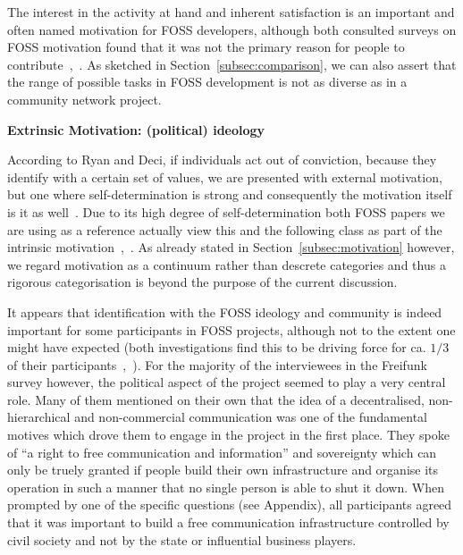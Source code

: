 The interest in the activity at hand and inherent satisfaction is an important and often named motivation for FOSS developers, although both consulted surveys on FOSS motivation found that it was not the primary reason for people to contribute~\cite{HarOu2002},~\cite{LakWo2005}.
As sketched in Section~\ref{subsec:comparison}, we can also assert that the range of possible tasks in FOSS development is not as diverse as in a community network project.

\textbf{Extrinsic Motivation: (political) ideology}

According to Ryan and Deci, if individuals act out of conviction, because they identify with a certain set of values, we are presented with external motivation, but one where self-determination is strong and consequently the motivation itself is it as well~\cite{RyDe2000}.
Due to its high degree of self-determination both FOSS papers we are using as a reference actually view this and the following class as part of the intrinsic motivation~\cite{LakWo2005},~\cite{HarOu2002}.
As already stated in Section~\ref{subsec:motivation} however, we regard motivation as a continuum rather than descrete categories and thus a rigorous categorisation is beyond the purpose of the current discussion.

It appears that identification with the FOSS ideology and community is indeed important for some participants in FOSS projects, although not to the extent one might have expected (both investigations find this to be driving force for ca. $1/3$ of their participants~\cite{HarOu2002},~\cite{LakWo2005}).
For the majority of the interviewees in the Freifunk survey however, the political aspect of the project seemed to play a very central role.
Many of them mentioned on their own that the idea of a decentralised, non-hierarchical and non-commercial communication was one of the fundamental motives which drove them to engage in the project in the first place.
They spoke of ``a right to free communication and information'' and sovereignty which can only be truely granted if people build their own infrastructure and organise its operation in such a manner that no single person is able to shut it down.
When prompted by one of the specific questions (see Appendix), all participants agreed that it was important to build a free communication infrastructure controlled by civil society and not by the state or influential business players.

